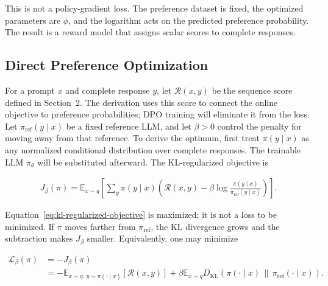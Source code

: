 \documentclass[11pt]{article}
\newcommand{\E}{\mathbb{E}}
\newcommand{\KL}{D_{\mathrm{KL}}}
\begin{document}
This is not a policy-gradient loss.  The preference dataset is fixed, the
optimized parameters are \(\phi\), and the logarithm acts on the predicted
preference probability.  The result is a reward model that assigns scalar
scores to complete responses.

\subsection{Direct Preference Optimization}

For a prompt \(x\) and complete response \(y\), let \(\mathcal R(x,y)\) be
the sequence score defined in Section~2.  The derivation uses this score to
connect the online objective to preference probabilities; DPO training will
eliminate it from the loss.  Let \(\pi_{\mathrm{ref}}(y\mid x)\) be a fixed
reference LLM, and let \(\beta>0\) control the penalty for moving away from
that reference.  To derive the optimum, first treat
\(\pi(y\mid x)\) as any normalized conditional distribution over complete
responses.  The trainable LLM \(\pi_\theta\) will be substituted afterward.
The KL-regularized objective is \cite{rafailov2023dpo}

\begin{equation}
    \begin{split}
    J_\beta(\pi)
      =\E_{x\sim q}\!\left[
        \sum_y\pi(y\mid x)
        \left(
        \mathcal R(x,y)
        -\beta\log\frac{\pi(y\mid x)}
                            {\pi_{\mathrm{ref}}(y\mid x)}
        \right)
      \right].
    \end{split}
    \label{eq:kl-regularized-objective}
\end{equation}

Equation~\eqref{eq:kl-regularized-objective} is maximized; it is not a loss to
be minimized.  If \(\pi\) moves farther from \(\pi_{\mathrm{ref}}\), the KL
divergence grows and the subtraction makes \(J_\beta\) smaller.  Equivalently,
one may minimize

\begin{equation}
    \begin{split}
    \mathcal L_\beta(\pi)
    &=-J_\beta(\pi)\\
    &=-\E_{x\sim q,\,y\sim\pi(\cdot\mid x)}
       \left[\mathcal R(x,y)\right]
      +\beta\E_{x\sim q}
       \KL\!\left(
       \pi(\cdot\mid x)\,\|\,\pi_{\mathrm{ref}}(\cdot\mid x)
       \right).
    \end{split}
    \label{eq:kl-regularized-loss}
\end{equation}
\end{document}
